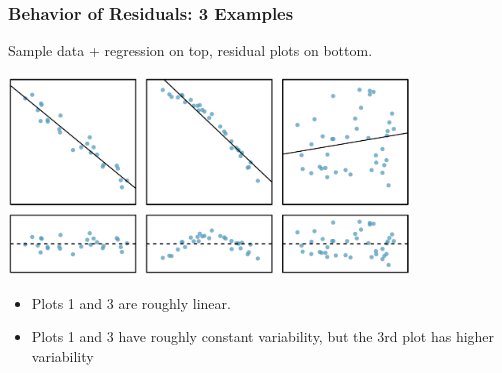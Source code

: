\documentclass[handout]{beamer}
\begin{document}
\begin{frame}[fragile]
\frametitle{Behavior of Residuals:  3 Examples}

Sample data + regression on top, residual plots on bottom.  
\begin{center}
\includegraphics[width=0.8\textwidth]{figure/resid.png}
\end{center}
\begin{itemize}
\pause\item Plots 1 and 3 are roughly linear.
\pause\item Plots 1 and 3 have roughly constant variability, but the 3rd plot has higher variability
\end{itemize}


\end{frame}
\end{document}

